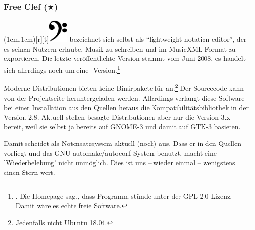 %
%
%

\subsubsection{Free Clef ($\bigstar$)}

\parpic(1cm,1cm)[r][t]{\includegraphics[width=1cm]{logos/freeclef-700dpi.png}}
\label{FreeClef} bezeichnet sich selbst als \enquote{lightweight
notation editor}, der es seinen Nutzern erlaube, Musik zu schreiben und im
MusicXML-Format zu exportieren. Die letzte veröffentlichte Version stammt vom
Juni 2008, es handelt sich allerdings noch um eine
-Version.\footnote{\cite[vgl.][\nopage wp]{FreeClef2008a}. Die Homepage
sagt, dass Programm stünde unter der GPL-2.0 Lizenz. Damit wäre es echte freie
Software.}

Moderne Distributionen bieten keine Binärpakete für 
an.\footnote{Jedenfalls nicht Ubuntu 18.04.} Der Sourcecode kann von der
Projektseite heruntergeladen werden. Allerdings verlangt diese Software bei
einer Installation aus den Quellen heraus die Kompatibilitätsbibliothek
 in der Version 2.8. Aktuell stellen besagte Distributionen aber
nur die Version 3.x bereit, weil sie selbst ja bereits auf GNOME-3 und damit auf
GTK-3 basieren.

Damit scheidet  als Notensatzsystem aktuell (noch) aus. Dass er
in den Quellen vorliegt und das GNU-automake/autoconf-System benutzt, macht eine
'Wiederbelebung' nicht unmöglich. Dies ist uns -- wieder einmal -- wenigstens
einen Stern wert.



%
